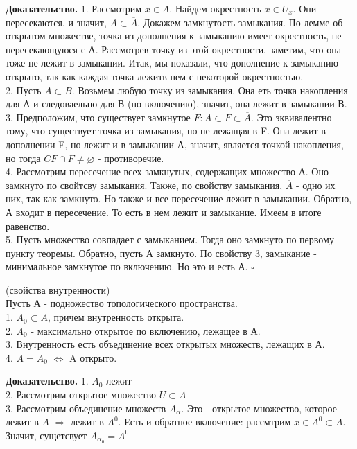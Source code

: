 \textbf{Доказательство.} 1. Рассмотрим $x\in A$. Найдем окрестность
$x\in U_x$. 
Они пересекаются, и значит, $A\subset \overline{A}$. Докажем замкнутость
замыкания. По лемме об открытом множестве, точка из дополнения к замыканию
имеет окрестность, не пересекающуюся с А. Рассмотрев точку из этой окрестности,
заметим, что она тоже не лежит в замыкании. Итак, мы показали, что 
дополнение к замыканию открыто, так как каждая точка лежитв нем
с некоторой окрестностью.\\
2. Пусть $A\subset B$. Возьмем любую точку из замыкания. Она еть точка 
накопления для А и следоваельно для В (по включению), значит, она лежит в 
замыкании В.\\
3. Предположим, что существует замкнутое $F:A\subset F\subset \overline{A}$. 
Это эквивалентно тому, что существует точка из замыкания, но не лежащая в F. 
Она лежит в дополнении F, но лежит и в замыкании А, значит, является точкой 
накопления, но тогда $CF\cap F\ne\varnothing$ - противоречие.\\
4. Рассмотрим пересечение всех замкнутых, содержащих множество А. Оно 
замкнуто по свойтсву замыкания. Также, по свойству замыкания, $\overline{A}$ - 
одно их них, так как замкнуто. Но также и все пересечение лежит в замыкании. 
Обратно, А входит в пересечение. То есть в нем лежит и замыкание. Имеем 
в итоге равенство.\\
5. Пусть множество совпадает с замыканием. Тогда оно замкнуто по первому 
пункту теоремы. Обратно, пусть А замкнуто. По свойству 3, замыкание 
- минимальное замкнутое по включению. Но это и есть А.
$\square$ 
\begin{theor}
    (свойства внутренности)\\
    Пусть А - подножество топологического пространства.\\
    1. $A_0\subset A$, причем внутренность открыта.\\
    2. $A_0$ - максимально открытое по включению, лежащее в А.\\
    3. Внутренность есть объединение всех открытых множеств, лежащих в А.\\
    4.  $A=A_0$  $\Leftrightarrow$ A открыто.
\end{theor}
\textbf{Доказательство.}  
1. $A_0$ лежит\\
2. Рассмотрим открытое множество $U\subset A$\\
3. Рассмотрим объединение множеств $A_\alpha$. Это - открытое множество, 
которое лежит в $A$  $\Rightarrow$ лежит в $A^0$. Есть и обратное включение:
рассмтрим  $x\in A^0\subset A$. Значит, сущетсвует $A_{\alpha_0}=A^0$
